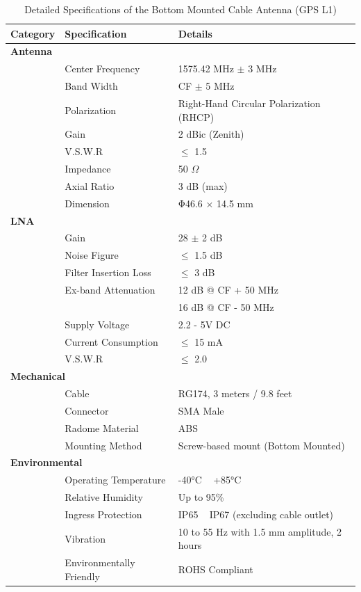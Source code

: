\documentclass[12pt,letter]{article}
\begin{document}
\begin{table}[h!]
    \centering
    \begin{tabular}{lll}
        \toprule
        \textbf{Category} & \textbf{Specification} & \textbf{Details} \\
        \midrule
        \multicolumn{3}{l}{\textbf{Antenna}} \\
        \midrule
        & Center Frequency & 1575.42 MHz $\pm$ 3 MHz \\
        & Band Width & CF $\pm$ 5 MHz \\
        & Polarization & Right-Hand Circular Polarization (RHCP) \\
        & Gain & 2 dBic (Zenith) \\
        & V.S.W.R & $\leq$ 1.5 \\
        & Impedance & 50 $\Omega$ \\
        & Axial Ratio & 3 dB (max) \\
        & Dimension & Φ46.6 × 14.5 mm \\
        \midrule
        \multicolumn{3}{l}{\textbf{LNA}} \\
        \midrule
        & Gain & 28 $\pm$ 2 dB \\
        & Noise Figure & $\leq$ 1.5 dB \\
        & Filter Insertion Loss & $\leq$ 3 dB \\
        & Ex-band Attenuation & 12 dB @ CF + 50 MHz \\
        & & 16 dB @ CF - 50 MHz \\
        & Supply Voltage & 2.2 - 5V DC \\
        & Current Consumption & $\leq$ 15 mA \\
        & V.S.W.R & $\leq$ 2.0 \\
        \midrule
        \multicolumn{3}{l}{\textbf{Mechanical}} \\
        \midrule
        & Cable & RG174, 3 meters / 9.8 feet \\
        & Connector & SMA Male \\
        & Radome Material & ABS \\
        & Mounting Method & Screw-based mount (Bottom Mounted) \\
        \midrule
        \multicolumn{3}{l}{\textbf{Environmental}} \\
        \midrule
        & Operating Temperature & -40°C ~ +85°C \\
        & Relative Humidity & Up to 95\% \\
        & Ingress Protection & IP65 ~ IP67 (excluding cable outlet) \\
        & Vibration & 10 to 55 Hz with 1.5 mm amplitude, 2 hours \\
        & Environmentally Friendly & ROHS Compliant \\
        \bottomrule
    \end{tabular}
    \caption{Detailed Specifications of the Bottom Mounted Cable Antenna (GPS L1)}
    \label{tab:bottom_mounted_antenna}
\end{table}
\end{document}
